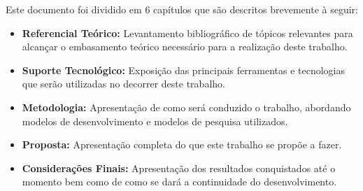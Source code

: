 Este documento foi dividido em 6 capítulos que são descritos brevemente à seguir:

\begin{itemize}
	\item \textbf{Referencial Teórico:} Levantamento bibliográfico de tópicos relevantes para alcançar o embasamento teórico necessário para a realização deste trabalho.
	\item \textbf{Suporte Tecnológico:} Exposição das principais ferramentas e tecnologias que serão utilizadas no decorrer deste trabalho.
	\item \textbf{Metodologia:} Apresentação de como será conduzido o trabalho, abordando modelos de desenvolvimento e modelos de pesquisa utilizados.
	\item \textbf{Proposta:} Apresentação completa do que este trabalho se propõe a fazer.
	\item \textbf{Considerações Finais:} Apresentação dos resultados conquistados até o momento bem como de como se dará a continuidade do desenvolvimento.
\end{itemize}

